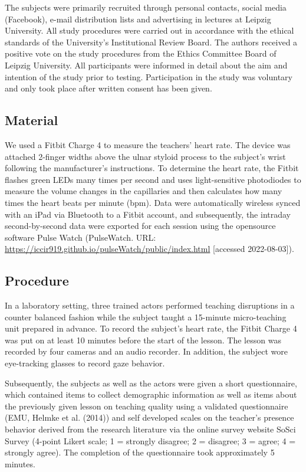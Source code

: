 \documentclass[
  man]{apa6}
\begin{document}
The subjects were primarily recruited through personal contacts, social media (Facebook), e-mail distribution lists and advertising in lectures at Leipzig University. All study procedures were carried out in accordance with the ethical standards of the University's Institutional Review Board. The authors received a positive vote on the study procedures from the Ethics Committee Board of Leipzig University. All participants were informed in detail about the aim and intention of the study prior to testing. Participation in the study was voluntary and only took place after written consent has been given.

\hypertarget{material}{%
\subsection{Material}\label{material}}

We used a Fitbit Charge 4 to measure the teachers' heart rate. The device was attached 2-finger widths above the ulnar styloid process to the subject's wrist following the manufacturer's instructions. To determine the heart rate, the Fitbit flashes green LEDs many times per second and uses light-sensitive photodiodes to measure the volume changes in the capillaries and then calculates how many times the heart beats per minute (bpm). Data were automatically wireless synced with an iPad via Bluetooth to a Fitbit account, and subsequently, the intraday second-by-second data were exported for each session using the opensource software Pulse Watch (PulseWatch. URL: \url{https://iccir919.github.io/pulseWatch/public/index.html} {[}accessed 2022-08-03{]}).

\hypertarget{procedure}{%
\subsection{Procedure}\label{procedure}}

In a laboratory setting, three trained actors performed teaching disruptions in a counter balanced fashion while the subject taught a 15-minute micro-teaching unit prepared in advance. To record the subject's heart rate, the Fitbit Charge 4 was put on at least 10 minutes before the start of the lesson. The lesson was recorded by four cameras and an audio recorder. In addition, the subject wore eye-tracking glasses to record gaze behavior.

Subsequently, the subjects as well as the actors were given a short questionnaire, which contained items to collect demographic information as well as items about the previously given lesson on teaching quality using a validated questionnaire (EMU, Helmke et al. (2014)) and self developed scales on the teacher's presence behavior derived from the research literature via the online survey website SoSci Survey (4-point Likert scale; 1 = strongly disagree; 2 = disagree; 3 = agree; 4 = strongly agree). The completion of the questionnaire took approximately 5 minutes.
\end{document}

